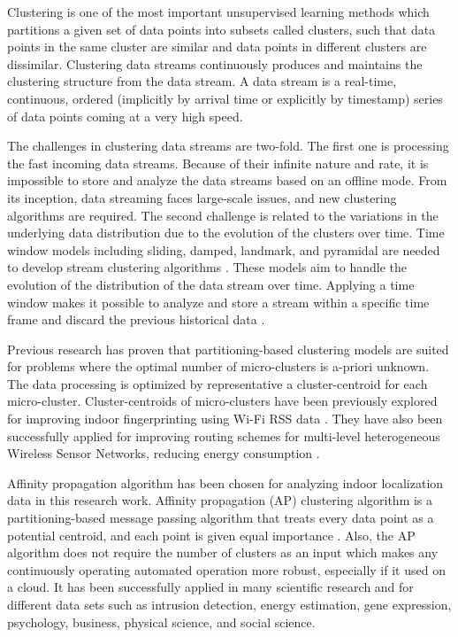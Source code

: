 Clustering is one of the most important unsupervised learning methods which partitions a given set of data points into subsets called clusters, such that data points in the same cluster are similar and data points in different clusters are dissimilar. Clustering data streams continuously produces and maintains the clustering structure from the data stream. A data stream is a real-time, continuous, ordered (implicitly by arrival time or explicitly by timestamp) series of data points coming at a very high speed.

The challenges in clustering data streams are two-fold. The first one is processing the fast incoming data streams. Because of their infinite nature and rate, it is impossible to store and analyze the data streams based on an offline mode. From its inception, data streaming faces large-scale issues, and new clustering algorithms are required.
The second challenge is related to the variations in the underlying data distribution due to the evolution of the clusters over time. Time window models including sliding, damped, landmark, and pyramidal are needed to develop stream clustering algorithms  \cite{nguyen2015survey}. These models aim to handle the evolution of the distribution of the data stream over time. Applying a time window makes it possible to analyze and store a stream within a specific time frame and discard the previous historical data \cite{mansalis2018evaluation}.


Previous research has proven that partitioning-based clustering models are suited for problems where the optimal number of micro-clusters is a-priori unknown. The data processing is optimized by representative a cluster-centroid for each micro-cluster. Cluster-centroids of micro-clusters have been previously explored for improving indoor fingerprinting using Wi-Fi RSS data \cite{hu2015improving, subedi2019improving}. They have also been successfully applied for improving routing schemes for multi-level heterogeneous Wireless Sensor Networks, reducing energy consumption \cite{wang2019affinity}. 

Affinity propagation algorithm has been chosen for analyzing indoor localization data in this research work. Affinity propagation (AP) clustering algorithm is a partitioning-based message passing algorithm that treats every data point as a potential centroid, and each point is given equal importance \cite{dueck2009affinity}. Also, the AP algorithm does not require the number of clusters as an input which makes any continuously operating automated operation more robust, especially if it used on a cloud. It has been successfully applied in many scientific research and for different data sets such as intrusion detection, energy estimation, gene expression, psychology, business, physical science, and social science.

